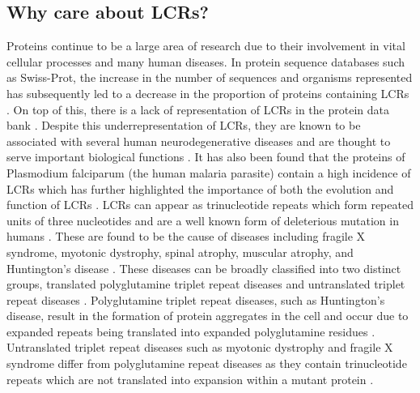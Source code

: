 \documentclass{article}
\begin{document}
\subsection{Why care about LCRs?}
Proteins continue to be a large area of research due to their involvement in vital cellular processes and many human
diseases. In protein sequence databases such as Swiss-Prot, the increase in the number of sequences and organisms represented
has subsequently led to a decrease in the proportion of proteins containing LCRs \citep{coletta2010low}. On top of this, there
is a lack of representation of LCRs in the protein data bank \citep{huntley2002simple}. Despite this underrepresentation
of LCRs, they are known to be associated with several human neurodegenerative diseases and are thought to serve important
biological functions \citep{coletta2010low, huntley2006selection}. It has also been found that the proteins of Plasmodium
falciparum (the human malaria parasite) contain a high incidence of LCRs which has further highlighted the importance of both
the evolution and function of LCRs \citep{gardner2002genome, depristo2006abundance}. LCRs can appear as trinucleotide repeats which
form repeated units of three nucleotides and are a well known form of deleterious mutation in humans \citep{ross1993genes}. These
are found to be the cause of diseases including fragile X syndrome, myotonic dystrophy, spinal atrophy, muscular atrophy,
and Huntington’s disease \citep{ross1993genes}. These diseases can be broadly classified into two distinct groups, translated
polyglutamine triplet repeat diseases and untranslated triplet repeat diseases \citep{everett2004trinucleotide}. Polyglutamine triplet
repeat diseases, such as Huntington’s disease, result in the formation of protein aggregates in the cell and occur due to expanded
repeats being translated into expanded polyglutamine residues \citep{everett2004trinucleotide}. Untranslated triplet repeat diseases
such as myotonic dystrophy and fragile X syndrome differ from polyglutamine repeat diseases as they contain trinucleotide
repeats which are not translated into expansion within a mutant protein \citep{everett2004trinucleotide}.
\end{document}
